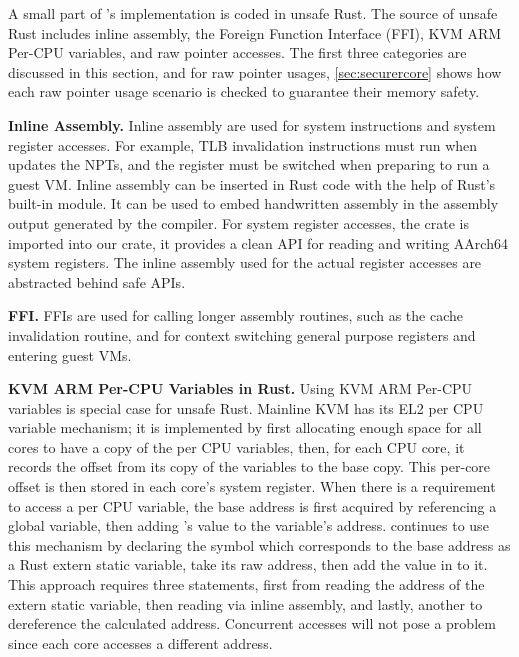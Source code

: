 A small part of \rustcore{}'s implementation is coded in unsafe Rust.
The source of unsafe Rust includes inline assembly, the Foreign Function
Interface (FFI), KVM ARM Per-CPU variables, and raw pointer accesses.
The first three categories are discussed in this section,
and for raw pointer usages, \autoref{sec:securercore} shows how each raw
pointer usage scenario is checked to guarantee their memory safety.

\textbf{Inline Assembly.}
Inline assembly are used for system instructions and system register accesses.
For example, TLB invalidation instructions must run when \rustcore{} updates the
NPTs, and the  register must be switched when preparing to run
a guest VM.
Inline assembly can be inserted in Rust code with the help of Rust's built-in
 module. It can be used to embed handwritten assembly in
the assembly output generated by the compiler.
For system register accesses, the  crate
\cite{aarch64cpu} is imported into our \rustcore{} crate, it provides a clean
API for reading and writing AArch64 system registers. The inline assembly used
for the actual register accesses are abstracted behind safe APIs.

\textbf{FFI.}
FFIs are used for calling longer assembly routines, such as the cache
invalidation routine, and  for context switching general
purpose registers and entering guest VMs.

\textbf{KVM ARM Per-CPU Variables in Rust.}
Using KVM ARM Per-CPU variables is special case for unsafe Rust.
Mainline KVM has its EL2 per CPU variable mechanism; it is implemented by first
allocating enough space for all cores to have a copy of the per CPU variables,
then, for each CPU core, it records the offset from its copy of the variables to the
base copy. This per-core offset is then stored in each core's 
system register. When there is a requirement to access a per CPU variable, the
base address is first acquired by referencing a global variable, then adding
's value to the variable's address. \rustsec{} continues to use
this mechanism by declaring the symbol which corresponds to the base address as
a Rust extern static variable, take its raw address, then add the value in
 to it. This approach requires three  statements,
first from reading the address of the extern static variable, then reading
 via inline assembly, and lastly, another  to
dereference the calculated address. Concurrent accesses will not pose a problem
since each core accesses a different address.

